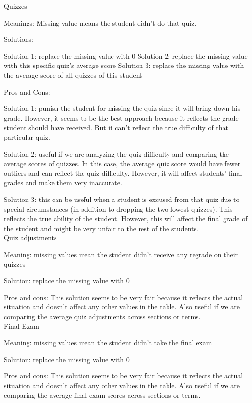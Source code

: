 \documentclass[9pt,twoside]{exam}
\begin{document}
Quizzes

Meanings: 
Missing value means the student didn't do that quiz. 


Solutions:

Solution 1: replace the missing value with 0
Solution 2: replace the missing value with this specific quiz's average score
Solution 3: replace the missing value with the average score of all quizzes of this student 


Pros and Cons:

Solution 1: punish the student for missing the quiz since it will bring down his grade. However, it seems to be the best approach because it reflects the grade student should have received. But it can't reflect the true difficulty of that particular quiz.


Solution 2: useful if we are analyzing the quiz difficulty and comparing the average scores of quizzes. In this case, the average quiz score would have fewer outliers and can reflect the quiz difficulty. However, it will affect students' final grades and make them very inaccurate.


Solution 3: this can be useful when a student is excused from that quiz due to special circumstances (in addition to dropping the two lowest quizzes). This reflects the true ability of the student. However, this will affect the final grade of the student and might be very unfair to the rest of the students.\\


Quiz adjustments

Meaning: missing values mean the student didn't receive any regrade on their quizzes

Solution: replace the missing value with 0

Pros and cons: 
This solution seems to be very fair because it reflects the actual situation and doesn't affect any other values in the table. Also useful if we are comparing the average quiz adjustments across sections or terms. \\

Final Exam

Meaning: missing values mean the student didn't take the final exam

Solution: replace the missing value with 0

Pros and cons: 
This solution seems to be very fair because it reflects the actual situation and doesn't affect any other values in the table. Also useful if we are comparing the average final exam scores across sections or terms. 
\end{document}
